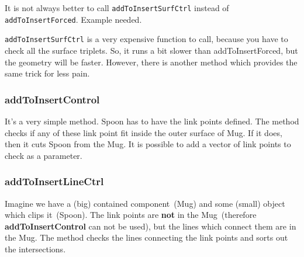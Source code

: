 It is not always better to call {\tt addToInsertSurfCtrl} instead of {\tt addToInsertForced}. \alert{Example needed.}

{\tt addToInsertSurfCtrl} is a very expensive function to call, because you have to check all the surface triplets. So, it runs a bit slower than addToInsertForced, but the geometry will be faster.
However, there is another method which provides the same trick for less pain.

\subsubsection{addToInsertControl}
It's a very simple method. Spoon has to have the link points defined.
The method checks if any of these link point fit inside the outer surface of Mug. If it does, then it cuts Spoon from the Mug.
It is possible to add a vector of link points to check as a parameter.

\subsubsection{addToInsertLineCtrl}
Imagine we have a (big) contained component~(Mug) and some (small) object which clips it~(Spoon). The link points are {\bf not} in the Mug~(therefore {\bf addToInsertControl} can not be used), but the lines which connect them are in the Mug.
The method checks the lines connecting the link points and sorts out the intersections.
